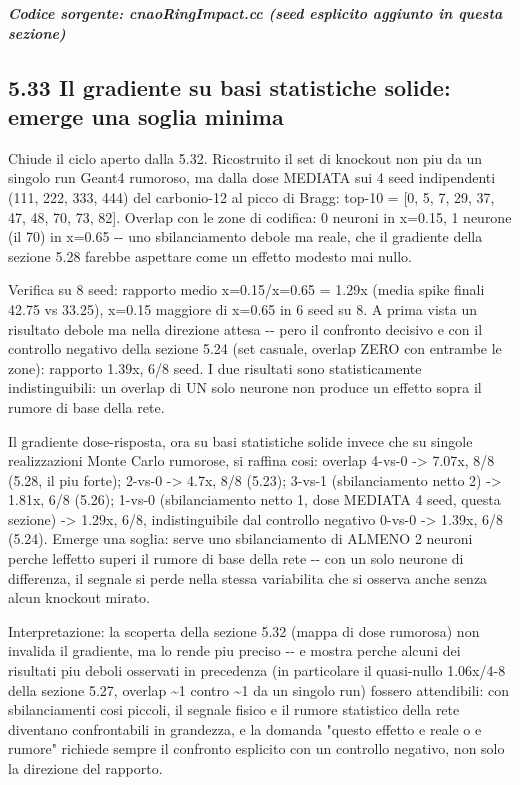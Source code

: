 \documentclass[
  italian,
]{article}
\begin{document}
\textit{\textbf{Codice sorgente: cnaoRingImpact.cc (seed esplicito aggiunto in questa sezione)}}


\subsection{5.33 Il gradiente su basi statistiche solide: emerge una soglia minima}\label{il-gradiente-su-basi-statistiche-solide-emerge-una-soglia-minima}

Chiude il ciclo aperto dalla 5.32. Ricostruito il set di knockout non piu\textquotesingle{} da un singolo run Geant4 rumoroso, ma dalla dose MEDIATA sui 4 seed indipendenti (111, 222, 333, 444) del carbonio-12 al picco di Bragg: top-10 = {[}0, 5, 7, 29, 37, 47, 48, 70, 73, 82{]}. Overlap con le zone di codifica: 0 neuroni in x=0.15, 1 neurone (il 70) in x=0.65 -\/- uno sbilanciamento debole ma reale, che il gradiente della sezione 5.28 farebbe aspettare come un effetto modesto mai nullo.

Verifica su 8 seed: rapporto medio x=0.15/x=0.65 = 1.29x (media spike finali 42.75 vs 33.25), x=0.15 maggiore di x=0.65 in 6 seed su 8. A prima vista un risultato debole ma nella direzione attesa -\/- pero\textquotesingle{} il confronto decisivo e\textquotesingle{} con il controllo negativo della sezione 5.24 (set casuale, overlap ZERO con entrambe le zone): rapporto 1.39x, 6/8 seed. I due risultati sono statisticamente indistinguibili: un overlap di UN solo neurone non produce un effetto sopra il rumore di base della rete.

Il gradiente dose-risposta, ora su basi statistiche solide invece che su singole realizzazioni Monte Carlo rumorose, si raffina cosi\textquotesingle: overlap 4-vs-0 -\textgreater{} 7.07x, 8/8 (5.28, il piu\textquotesingle{} forte); 2-vs-0 -\textgreater{} 4.7x, 8/8 (5.23); 3-vs-1 (sbilanciamento netto 2) -\textgreater{} 1.81x, 6/8 (5.26); 1-vs-0 (sbilanciamento netto 1, dose MEDIATA 4 seed, questa sezione) -\textgreater{} 1.29x, 6/8, indistinguibile dal controllo negativo 0-vs-0 -\textgreater{} 1.39x, 6/8 (5.24). Emerge una soglia: serve uno sbilanciamento di ALMENO 2 neuroni perche\textquotesingle{} l\textquotesingle effetto superi il rumore di base della rete -\/- con un solo neurone di differenza, il segnale si perde nella stessa variabilita\textquotesingle{} che si osserva anche senza alcun knockout mirato.

Interpretazione: la scoperta della sezione 5.32 (mappa di dose rumorosa) non invalida il gradiente, ma lo rende piu\textquotesingle{} preciso -\/- e mostra perche\textquotesingle{} alcuni dei risultati piu\textquotesingle{} deboli osservati in precedenza (in particolare il quasi-nullo 1.06x/4-8 della sezione 5.27, overlap \textasciitilde1 contro \textasciitilde1 da un singolo run) fossero attendibili: con sbilanciamenti cosi\textquotesingle{} piccoli, il segnale fisico e il rumore statistico della rete diventano confrontabili in grandezza, e la domanda "questo effetto e\textquotesingle{} reale o e\textquotesingle{} rumore" richiede sempre il confronto esplicito con un controllo negativo, non solo la direzione del rapporto.
\end{document}
